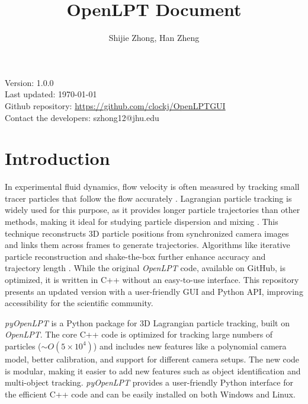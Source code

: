 \documentclass[a4paper,fleqn]{article}
\title{OpenLPT Document}
\author{Shijie Zhong, Han Zheng}
\date{}
\begin{document}
\maketitle
\thispagestyle{empty}
\tableofcontents
\vfill
\begin{minipage}{14cm}{
\small \sffamily
Version: 1.0.0 \\
Last updated: \today  \\
Github repository: \url{https://github.com/clockj/OpenLPTGUI} \\
Contact the developers: szhong12@jhu.edu
 }
\end{minipage}

\newpage
{}


\section{Introduction}


In experimental fluid dynamics, flow velocity is often measured by tracking small tracer particles that follow the flow accurately \citep{nishino1989three,papantoniou1989analyzing}. Lagrangian particle tracking is widely used for this purpose, as it provides longer particle trajectories than other methods, making it ideal for studying particle dispersion and mixing \citep{barta2024proptv,schanz2016shake,tan2020introducing,shnapp2022myptv}. This technique reconstructs 3D particle positions from synchronized camera images and links them across frames to generate trajectories. Algorithms like iterative particle reconstruction and shake-the-box further enhance accuracy and trajectory length \citep{wieneke2012iterative, schanz2016shake}. While the original \textit{OpenLPT} code, available on GitHub, is optimized, it is written in C++ without an easy-to-use interface. This repository presents an updated version with a user-friendly GUI and Python API, improving accessibility for the scientific community.


\textit{pyOpenLPT} is a Python package for 3D Lagrangian particle tracking, built on \textit{OpenLPT}. The core C++ code is optimized for tracking large numbers of particles ($\sim O(5\times10^4)$) and includes new features like a polynomial camera model, better calibration, and support for different camera setups. The new code is modular, making it easier to add new features such as object identification and multi-object tracking. \textit{pyOpenLPT} provides a user-friendly Python interface for the efficient C++ code and can be easily installed on both Windows and Linux.
\end{document}
